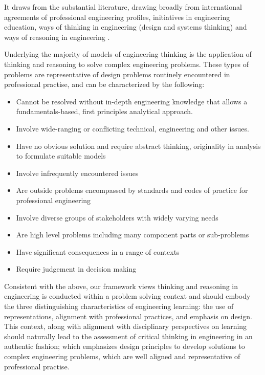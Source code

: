 It draws from the substantial literature, drawing broadly from international agreements of professional engineering profiles\cite{internationalengineeringalliance}, initiatives in engineering education\cite{crawley2011cdio}, ways of thinking in engineering (design and systems thinking) \cite{Dorst:2010tc, Dym:2005gy, Frank:2001ut}and ways of reasoning in engineering \cite{Stein:2011hr, Paul:2006kv}. 

Underlying the majority of models of engineering thinking is the application of thinking and reasoning to solve complex engineering problems. These types of problems are representative of design problems routinely encountered in professional practise, and can be characterized by the following\cite{internationalengineeringalliance}: 

\begin{itemize}
\item Cannot be resolved without in-depth engineering knowledge that allows a fundamentals-based, first principles analytical approach.
\item Involve wide-ranging or conflicting technical, engineering and other issues.
\item Have no obvious solution and require abstract thinking, originality in analysis to formulate suitable models
\item Involve infrequently encountered issues
\item Are outside problems encompassed by standards and codes of practice for professional engineering
\item Involve diverse groups of stakeholders with widely varying needs
\item Are high level problems including many component parts or sub-problems
\item Have significant consequences in a range of contexts
\item Require judgement in decision making
\end{itemize}

Consistent with the above, our framework views thinking and reasoning in engineering is conducted within a problem solving context and should embody the three distinguishing characteristics of engineering learning: the use of representations, alignment with professional practices, and emphasis on design\cite{Johri:2014tk}. This context, along with alignment with disciplinary perspectives on learning should naturally lead to the assessment of critical thinking in engineering in an authentic fashion; which emphasizes design principles to develop solutions to  complex engineering problems, which are well aligned and representative of professional practise.

